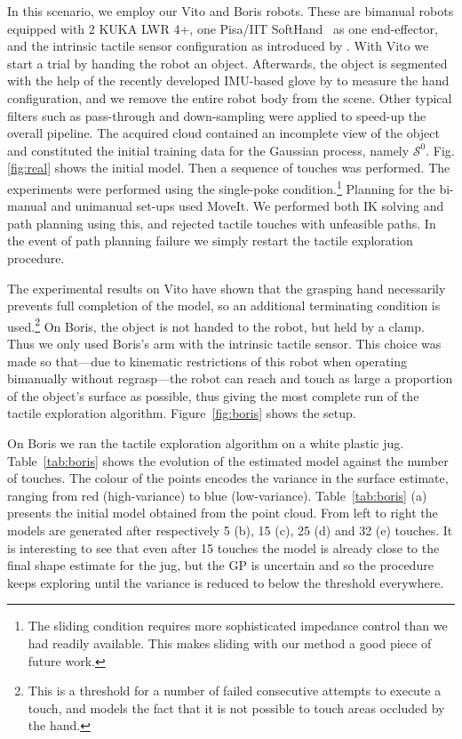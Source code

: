 In this scenario, we employ our Vito and Boris robots. These are bimanual robots equipped with 2 KUKA LWR 4+, one Pisa/IIT SoftHand~\cite{Catalano2014Adaptive} as one end-effector, and the intrinsic tactile sensor configuration as introduced by \cite{Rosales2014Active}. With Vito we start a trial by handing the robot an object. Afterwards, the object is segmented with the help of the recently developed IMU-based glove by \cite{Santaera2015Lowcost} to measure the hand configuration, and we remove the entire robot body from the scene. Other typical filters such as pass-through and down-sampling were applied to speed-up the overall pipeline. The acquired cloud contained an incomplete view of the object and constituted the initial training data for the Gaussian process, namely $\mathcal{S}^0$. Fig. \ref{fig:real} shows the initial model. Then a sequence of touches was performed. The experiments were performed using the single-poke condition.\footnote{The sliding condition requires more sophisticated impedance control than we had readily available. This makes sliding with our method a good piece of future work.} Planning for the bi-manual and unimanual set-ups used MoveIt. We performed both IK solving and path planning using this, and rejected tactile touches with unfeasible paths. In the event of path planning failure we simply restart the tactile exploration procedure.

The experimental results on Vito have shown that the grasping hand necessarily prevents full completion of the model, so an additional terminating condition is used.\footnote{This is a threshold for a number of failed consecutive attempts to execute a touch, and models the fact that it is not possible to touch areas occluded by the hand.} 
On Boris, the object is not handed to the robot, but held by a clamp. Thus we only used Boris's arm with the intrinsic tactile sensor. This choice was made so that---due to kinematic restrictions of this robot when operating bimanually without regrasp---the robot can reach and touch as large a proportion of the object's surface as possible, thus giving the most complete run of the tactile exploration algorithm. Figure~\ref{fig:boris} shows the setup.

On Boris we ran the tactile exploration algorithm on a white plastic jug. Table~\ref{tab:boris} shows the evolution of the estimated model against the number of touches. The colour of the points encodes the variance in the surface estimate, ranging from red (high-variance) to blue (low-variance). Table~\ref{tab:boris} (a) presents the initial model obtained from the point cloud. From left to right the models are generated after respectively 5 (b), 15 (c), 25 (d) and 32 (e) touches. It is interesting to see that even after 15 touches the model is already close to the final shape estimate for the jug, but the GP is uncertain and so the procedure keeps exploring until the variance is reduced to below the threshold everywhere. 


